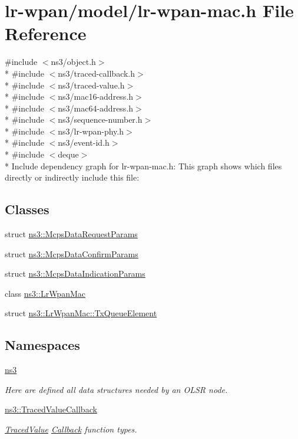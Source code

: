 \hypertarget{lr-wpan-mac_8h}{}\section{lr-\/wpan/model/lr-\/wpan-\/mac.h File Reference}
\label{lr-wpan-mac_8h}
{\ttfamily \#include $<$ns3/object.\+h$>$}\\*
{\ttfamily \#include $<$ns3/traced-\/callback.\+h$>$}\\*
{\ttfamily \#include $<$ns3/traced-\/value.\+h$>$}\\*
{\ttfamily \#include $<$ns3/mac16-\/address.\+h$>$}\\*
{\ttfamily \#include $<$ns3/mac64-\/address.\+h$>$}\\*
{\ttfamily \#include $<$ns3/sequence-\/number.\+h$>$}\\*
{\ttfamily \#include $<$ns3/lr-\/wpan-\/phy.\+h$>$}\\*
{\ttfamily \#include $<$ns3/event-\/id.\+h$>$}\\*
{\ttfamily \#include $<$deque$>$}\\*
Include dependency graph for lr-\/wpan-\/mac.h\+:
This graph shows which files directly or indirectly include this file\+:
\subsection*{Classes}
\begin{DoxyCompactItemize}
\item 
struct \hyperlink{structns3_1_1McpsDataRequestParams}{ns3\+::\+Mcps\+Data\+Request\+Params}
\item 
struct \hyperlink{structns3_1_1McpsDataConfirmParams}{ns3\+::\+Mcps\+Data\+Confirm\+Params}
\item 
struct \hyperlink{structns3_1_1McpsDataIndicationParams}{ns3\+::\+Mcps\+Data\+Indication\+Params}
\item 
class \hyperlink{classns3_1_1LrWpanMac}{ns3\+::\+Lr\+Wpan\+Mac}
\item 
struct \hyperlink{structns3_1_1LrWpanMac_1_1TxQueueElement}{ns3\+::\+Lr\+Wpan\+Mac\+::\+Tx\+Queue\+Element}
\end{DoxyCompactItemize}
\subsection*{Namespaces}
\begin{DoxyCompactItemize}
\item 
 \hyperlink{namespacens3}{ns3}
\begin{DoxyCompactList}\small\item\em Here are defined all data structures needed by an O\+L\+SR node. \end{DoxyCompactList}\item 
 \hyperlink{namespacens3_1_1TracedValueCallback}{ns3\+::\+Traced\+Value\+Callback}
\begin{DoxyCompactList}\small\item\em \hyperlink{classns3_1_1TracedValue}{Traced\+Value} \hyperlink{classns3_1_1Callback}{Callback} function types. \end{DoxyCompactList}\end{DoxyCompactItemize}
